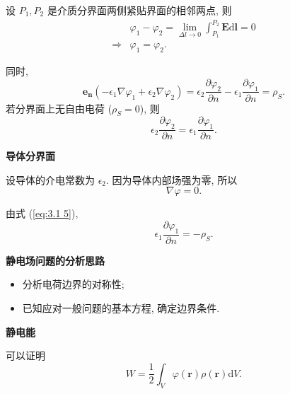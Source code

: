 设 $P_1,P_2$ 是介质分界面两侧紧贴界面的相邻两点, 则
\begin{align*}
                & \varphi_1-\varphi_2  =\lim_{\Delta l\rightarrow 0}\int_{P_1}^{P_2}\bm{E}\mathrm{d}\bm{l}=0 \\
    \Rightarrow & \varphi_1            =\varphi_2.
\end{align*}

同时,
\begin{equation} \label{eq:3.1 5}
    \bm{e_n}(-\epsilon_1\nabla\varphi_1+\epsilon_2\nabla\varphi_2)=\epsilon_2\frac{\partial\varphi_2}{\partial n}-\epsilon_1\frac{\partial\varphi_1}{\partial n}=\rho_S.
\end{equation}
若分界面上无自由电荷 ($\rho_S=0$), 则
\begin{equation}
    \epsilon_2\frac{\partial\varphi_2}{\partial n}=\epsilon_1\frac{\partial\varphi_1}{\partial n}.
\end{equation}

\textbf{导体分界面}

设导体的介电常数为 $\epsilon_2$. 因为导体内部场强为零, 所以
\begin{equation}
    \nabla\varphi=0.
\end{equation}

由式 (\ref{eq:3.1 5}),
\begin{equation}
    \epsilon_1\frac{\partial\varphi_1}{\partial n}=-\rho_S.
\end{equation}

\textbf{静电场问题的分析思路}
\begin{itemize}
    \item 分析电荷边界的对称性;
    \item 已知应对一般问题的基本方程, 确定边界条件.
\end{itemize}

\textbf{静电能}

可以证明
\begin{equation}
    W=\frac{1}{2}\int_V\varphi(\bm{r})\rho(\bm{r})\mathrm{d}V.
\end{equation}

